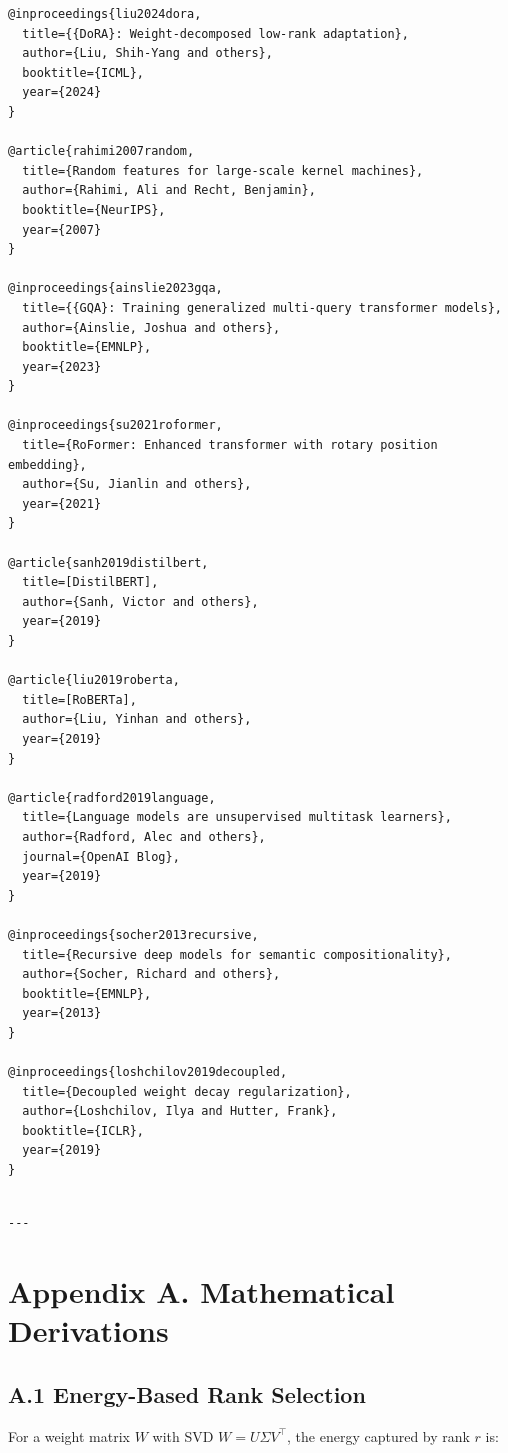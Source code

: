 \begin{lstlisting}
@inproceedings{liu2024dora,
  title={{DoRA}: Weight-decomposed low-rank adaptation},
  author={Liu, Shih-Yang and others},
  booktitle={ICML},
  year={2024}
}

@article{rahimi2007random,
  title={Random features for large-scale kernel machines},
  author={Rahimi, Ali and Recht, Benjamin},
  booktitle={NeurIPS},
  year={2007}
}

@inproceedings{ainslie2023gqa,
  title={{GQA}: Training generalized multi-query transformer models},
  author={Ainslie, Joshua and others},
  booktitle={EMNLP},
  year={2023}
}

@inproceedings{su2021roformer,
  title={RoFormer: Enhanced transformer with rotary position embedding},
  author={Su, Jianlin and others},
  year={2021}
}

@article{sanh2019distilbert,
  title=[DistilBERT],
  author={Sanh, Victor and others},
  year={2019}
}

@article{liu2019roberta,
  title=[RoBERTa],
  author={Liu, Yinhan and others},
  year={2019}
}

@article{radford2019language,
  title={Language models are unsupervised multitask learners},
  author={Radford, Alec and others},
  journal={OpenAI Blog},
  year={2019}
}

@inproceedings{socher2013recursive,
  title={Recursive deep models for semantic compositionality},
  author={Socher, Richard and others},
  booktitle={EMNLP},
  year={2013}
}

@inproceedings{loshchilov2019decoupled,
  title={Decoupled weight decay regularization},
  author={Loshchilov, Ilya and Hutter, Frank},
  booktitle={ICLR},
  year={2019}
}
\end{lstlisting}
\begin{lstlisting}

---
\end{lstlisting}

\section{Appendix A. Mathematical Derivations}

\subsection{A.1 Energy-Based Rank Selection}

For a weight matrix $W$ with SVD $W = U \Sigma V^\top$, the energy captured 
by rank $r$ is:

